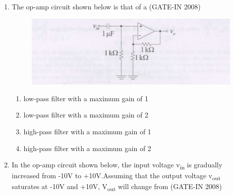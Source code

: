 \documentclass[journal,12pt,onecolumn]{IEEEtran}
\theoremstyle{remark}
\begin{document}
\begin{enumerate}
\begin{multicols}{4}     
    \begin{enumerate} 
        \item 10 V 
        \item 10.5 V
        \item 11 V
        \item 15 V
    \end{enumerate}
    \end{multicols}
    

    \item  The op-amp circuit shown below is that of a \hfill (GATE-IN 2008)
    \begin{figure}[H]
    \centering
    \includegraphics[width=0.5\columnwidth]{figs/i19.jpg}
    \caption{}
    \label{fig:placeholder19}
\end{figure}
\begin{multicols}{2}
    \begin{enumerate} 
        \item low-pass filter with a maximum gain of 1 
        \item low-pass filter with a maximum gain of 2
        \item high-pass filter with a maximum gain of 1 
        \item high-pass filter with a maximum gain of 2
    \end{enumerate}
    \end{multicols}
    
    \item In the op-amp circuit shown below, the input voltage v\textsubscript{in} is gradually increased from -10V to +10V.Assuming that the output voltage v\textsubscript{out} saturates at -10V and +10V, V\textsubscript{out} will change from \hfill (GATE-IN 2008)
    

\end{enumerate}
\end{document}
